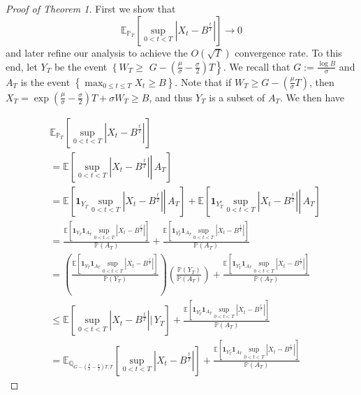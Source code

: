 \documentclass{article}
\theoremstyle{definition}
\theoremstyle{definition}
\begin{document}
\begin{proof}[Proof of Theorem 1] First we show that
\begin{equation}\label{zero}\mathbb{E}_{\mathbb{P}_{T}}\left [\sup _{0<t<T}\left |X_{t}-B^{\frac{t}{T}}\right |\right ] \rightarrow 0\end{equation}
and later refine our analysis to achieve the $O(\sqrt{T})$ convergence rate. To this end, let $Y_{T}$ be the event $\left\{W_{T} \geq\right.$ $\left.G-\left(\frac{\mu}{\sigma}-\frac{\sigma}{2}\right) T\right\}$. We recall that $G:=\frac{\log B}{\sigma}$ and $A_{T}$ is the event $\left\{\max _{0 \leq t \leq T} X_{t} \geq B\right\}$. Note that if $W_{T} \geq G-\left(\frac{\mu}{\sigma} T\right)$, then $X_{T}=\exp \left(\frac{\mu}{\sigma}-\frac{\sigma}{2}\right) T+\sigma W_{T} \geq B$, and thus $Y_{T}$ is a subset of $A_{T}$. We then have

$$\begin{aligned}
& \mathbb{E}_{\mathbb{P}_{T}}\left[\sup _{0<t<T}\left|X_{t}-B^{\frac{t}{T}}\right|\right] \\
& =\mathbb{E}\left[\left.\sup _{0<t<T}\left|X_{t}-B^{\frac{t}{T}}\right| \right\rvert\, A_{T}\right] \\
& =\mathbb{E}\left[\left.\mathbf{1}_{Y_{T}} \sup _{0<t<T}\left|X_{t}-B^{\frac{t}{T}}\right| \right\rvert\, A_{T}\right]+\mathbb{E}\left[\left.\mathbf{1}_{Y_{T}^{c}} \sup _{0<t<T}\left|X_{t}-B^{\frac{t}{T}}\right| \right\rvert\, A_{T}\right] \\
& =\frac{\mathbb{E}\left[\mathbf{1}_{Y_{T}} \mathbf{1}_{A_{T}} \sup _{0<t<T}\left|X_{t}-B^{\frac{t}{T}}\right|\right]}{\mathbb{P}\left(A_{T}\right)}+\frac{\mathbb{E}\left[\mathbf{1}_{Y_{T}^{c}} \mathbf{1}_{A_{T}} \sup _{0<t<T}\left|X_{t}-B^{\frac{t}{T}}\right|\right]}{\mathbb{P}\left(A_{T}\right)} \\
& =\left(\frac{\mathbb{E}\left[\mathbf{1}_{Y_{T}} \mathbf{1}_{A_{T}} \sup _{0<t<T}\left|X_{t}-B^{\frac{t}{T}}\right|\right]}{\mathbb{P}\left(Y_{T}\right)}\right)\left(\frac{\mathbb{P}\left(Y_{T}\right)}{\mathbb{P}\left(A_{T}\right)}\right)+\frac{\mathbb{E}\left[\mathbf{1}_{Y_{T}^{c}} \mathbf{1}_{A_{T}} \sup _{0<t<T}\left|X_{t}-B^{\frac{t}{T}}\right|\right]}{\mathbb{P}\left(A_{T}\right)} \\
& \leq \mathbb{E}\left [\sup _{0<t<T}\left|X_{t}-B^{\frac{t}{T}}\right | \big | \, Y_{T}\right ]+\frac{\mathbb E \left[\mathbf{1}_{Y_{T}^{c}} \mathbf{1}_{A_{T}} \sup_{0<t<T}\left|X_{t}-B^{\frac{t}{T}}\right|\right]}{\mathbb{P}\left(A_{T}\right)} \\
& = \mathbb E_{\mathbb{Q}_{G-(\frac{\mu}{\sigma}-\frac{\sigma}{2})T, T}} \left[\sup _{0<t<T}\left|X_{t}-B^{\frac{t}{T}}\right|\right]+\frac{\mathbb{E}\left[\mathbf{1}_{Y_{T}^{c}} \mathbf{1}_{A_{T}} \sup _{0<t<T}\left|X_{t}-B^{\frac{t}{T}}\right|\right]}{\mathbb{P}\left(A_{T}\right)}
\end{aligned}$$


\end{proof}
\end{document}
